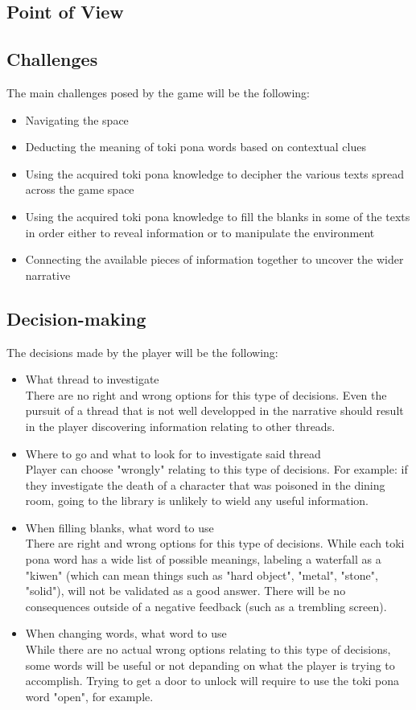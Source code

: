 \documentclass{scrartcl}
\begin{document}
		\subsection{Point of View}
		
		\subsection{Challenges}
		The main challenges posed by the game will be the following:
		\begin{itemize}
			\item Navigating the space
			\item Deducting the meaning of toki pona words based on contextual clues
			\item Using the acquired toki pona knowledge to decipher the various texts spread across the game space
			\item Using the acquired toki pona knowledge to fill the blanks in some of the texts in order either to reveal information or to manipulate the environment
			\item Connecting the available pieces of information together to uncover the wider narrative
		\end{itemize}

		\subsection{Decision-making}
		The decisions made by the player will be the following:
		\begin{itemize}
			\item What thread to investigate\\
			There are no right and wrong options for this type of decisions. Even the pursuit of a thread that is not well developped in the narrative should result in the player discovering information relating to other threads.
			\item Where to go and what to look for to investigate said thread\\
			Player can choose "wrongly" relating to this type of decisions. For example: if they investigate the death of a character that was poisoned in the dining room, going to the library is unlikely to wield any useful information.
			\item When filling blanks, what word to use\\
			There are right and wrong options for this type of decisions. While each toki pona word has a wide list of possible meanings, labeling a waterfall as a "kiwen" (which can mean things such as "hard object", "metal", "stone", "solid"), will not be validated as a good answer. There will be no consequences outside of a negative feedback (such as a trembling screen).
			\item When changing words, what word to use\\
			While there are no actual wrong options relating to this type of decisions, some words will be useful or not depanding on what the player is trying to accomplish. Trying to get a door to unlock will require to use the toki pona word "open", for example.
		\end{itemize}
\end{document}
